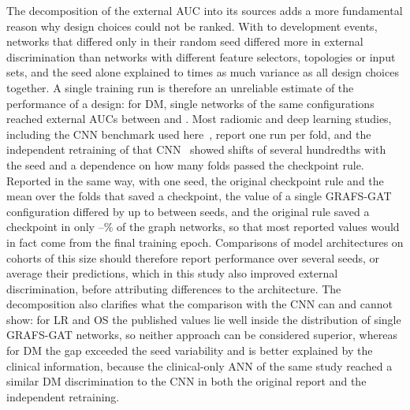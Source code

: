 \documentclass[11pt,a4paper]{article}
\newcommand{\method}{GRAFS-GAT}
\begin{document}
The decomposition of the external AUC into its sources adds a more fundamental reason why design choices could not be ranked. With \eLRHNPET{} to \eOSHNPET{} development events, networks that differed only in their random seed differed more in external discrimination than networks with different feature selectors, topologies or input sets, and the seed alone explained \vcRatioMin{} to \vcRatioMax{} times as much variance as all design choices together. A single training run is therefore an unreliable estimate of the performance of a design: for DM, single networks of the same configurations reached external AUCs between \singleDMMin{} and \singleDMMax. Most radiomic and deep learning studies, including the CNN benchmark used here~\cite{mateus2023}, report one run per fold, and the independent retraining of that CNN~\cite{shaikh2026repro} showed shifts of several hundredths with the seed and a dependence on how many folds passed the checkpoint rule. Reported in the same way, with one seed, the original checkpoint rule and the mean over the folds that saved a checkpoint, the value of a single \method{} configuration differed by up to \msSpreadMax{} between seeds, and the original rule saved a checkpoint in only \msSavedDM--\msSavedLR\% of the graph networks, so that most reported values would in fact come from the final training epoch. Comparisons of model architectures on cohorts of this size should therefore report performance over several seeds, or average their predictions, which in this study also improved external discrimination, before attributing differences to the architecture. The decomposition also clarifies what the comparison with the CNN can and cannot show: for LR and OS the published values lie well inside the distribution of single \method{} networks, so neither approach can be considered superior, whereas for DM the gap exceeded the seed variability and is better explained by the clinical information, because the clinical-only ANN of the same study reached a similar DM discrimination to the CNN in both the original report and the independent retraining.
\end{document}
